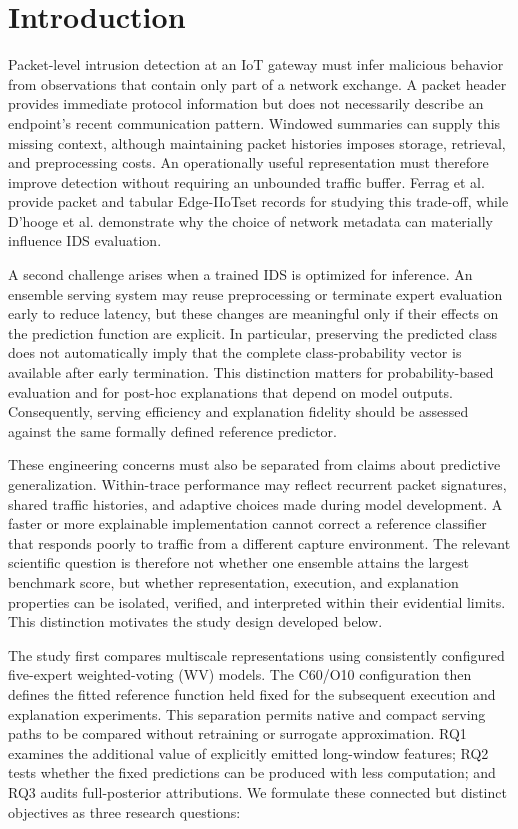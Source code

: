 \documentclass[final,3p,10pt,nopreprintline]{elsarticle}
\begin{document}
\section{Introduction}

Packet-level intrusion detection at an IoT gateway must infer malicious behavior from observations that contain only part of a network exchange. A packet header provides immediate protocol information but does not necessarily describe an endpoint's recent communication pattern. Windowed summaries can supply this missing context, although maintaining packet histories imposes storage, retrieval, and preprocessing costs. An operationally useful representation must therefore improve detection without requiring an unbounded traffic buffer. Ferrag et al. \cite{r1} provide packet and tabular Edge-IIoTset records for studying this trade-off, while D'hooge et al. \cite{r2} demonstrate why the choice of network metadata can materially influence IDS evaluation.

A second challenge arises when a trained IDS is optimized for inference. An ensemble serving system may reuse preprocessing or terminate expert evaluation early to reduce latency, but these changes are meaningful only if their effects on the prediction function are explicit. In particular, preserving the predicted class does not automatically imply that the complete class-probability vector is available after early termination. This distinction matters for probability-based evaluation and for post-hoc explanations that depend on model outputs. Consequently, serving efficiency and explanation fidelity should be assessed against the same formally defined reference predictor.

These engineering concerns must also be separated from claims about predictive generalization. Within-trace performance may reflect recurrent packet signatures, shared traffic histories, and adaptive choices made during model development. A faster or more explainable implementation cannot correct a reference classifier that responds poorly to traffic from a different capture environment. The relevant scientific question is therefore not whether one ensemble attains the largest benchmark score, but whether representation, execution, and explanation properties can be isolated, verified, and interpreted within their evidential limits. This distinction motivates the study design developed below.

The study first compares multiscale representations using consistently configured five-expert weighted-voting (WV) models. The C60/O10 configuration then defines the fitted reference function held fixed for the subsequent execution and explanation experiments. This separation permits native and compact serving paths to be compared without retraining or surrogate approximation. RQ1 examines the additional value of explicitly emitted long-window features; RQ2 tests whether the fixed predictions can be produced with less computation; and RQ3 audits full-posterior attributions. We formulate these connected but distinct objectives as three research questions:
\end{document}
